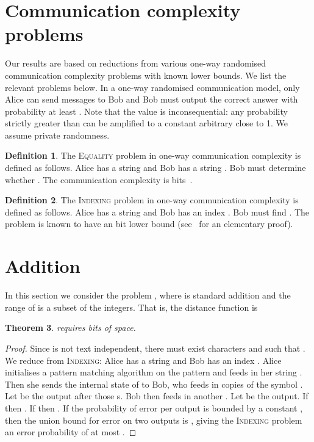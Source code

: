 \documentclass{article}
\newcommand{\indexing}{\textsc{Indexing}\xspace}
\newcommand{\equality}{\textsc{Equality}\xspace}
\theoremstyle{plain}
\newtheorem{theorem}{Theorem}[]
\theoremstyle{definition}
\newtheorem{definition}[theorem]{Definition}
\begin{document}
\section{Communication complexity problems}

Our results are based on reductions from various one-way randomised communication complexity problems with known lower bounds. We list the relevant problems below. In a one-way randomised communication model, only Alice can send messages to Bob and Bob must output the correct answer with probability at least . Note that the value  is inconsequential: any probability strictly greater than  can be amplified to a constant arbitrary close to 1. We assume private randomness.

\begin{definition}
    The \equality problem in one-way communication complexity is defined as follows. Alice has a string  and Bob has a string . Bob must determine whether . The communication complexity is  bits~\cite{Yao:79}.
\end{definition}

\begin{definition}
    \label{def:indexing}
    The \indexing problem in one-way communication complexity is defined as follows. Alice has a string  and Bob has an index . Bob must find . The problem is known to have an  bit lower bound (see~\cite{JKS:08} for an elementary proof).
\end{definition}


\section{Addition}\label{sec:addition}

In this section we consider the problem , where  is standard addition and the range of  is a subset of the integers. That is, the distance function is


\begin{theorem}
     requires  bits of space.
\end{theorem}
\begin{proof}
    Since  is not text independent, there must exist characters  and  such that . We reduce from \indexing: Alice has a string  and Bob has an index . Alice initialises a pattern matching algorithm  on the pattern  and feeds in her string . Then she sends the internal state of  to Bob, who feeds in  copies of the symbol . Let  be the output after those s. Bob then feeds in another . Let  be the output. If  then . If  then . If the probability of error per output is bounded by a constant , then the union bound for error on two outputs is , giving the \indexing problem an error probability of at most .
\end{proof}
\end{document}
